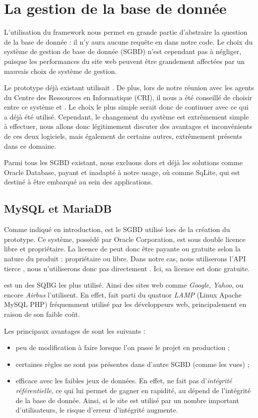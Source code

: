 \section{La gestion de la base de donnée}

L'utilisation du framework \symfony nous permet en grande partie d'abstraire la question de la base de donnée : il n'y aura aucune requête en \sql dans notre code. 
Le choix du système de gestion de base de donnée (SGBD) n'est cependant pas  à négliger, puisque les performances du site web peuvent être grandement affectées par un mauvais choix de système de gestion. 

Le prototype déjà existant utilisait \mysql. 
De plus, lors de notre réunion avec les agents du Centre des Ressources en Informatique (CRI), il nous a été conseillé de choisir entre ce système et \psql. 
Le choix le plus simple serait donc de continuer avec ce qui a déjà été utilisé. 
Cependant, le changement du système est extrêmement simple à effectuer, nous allons donc légitimement  discuter des avantages et inconvénients de ces deux logiciels, mais également de certains autres, extrêmement présents dans ce domaine. 

Parmi tous les SGBD existant, nous excluons dors et déjà les solutions comme Oracle Database, payant et inadapté à notre usage, où comme SqLite, qui est destiné à être embarqué au sein des applications. 
\subsection{MySQL et MariaDB}
 
 Comme indiqué en introduction, \mysql est le SGBD utilisé lors de la création du prototype. Ce système, possédé par Oracle Corporation, est sous double licence libre et propriétaire. La licence de \mysql peut donc être payante ou gratuite selon la nature du produit : propriétaire ou libre. Dans notre cas, nous utiliserons l'API tierce \symfony, nous n'utiliserons donc pas directement \mysql. Ici, sa licence est donc gratuite. 
 
 \mysql est un des SQBG les plus utilisé. Ainsi des sites web comme \textit{Google}, \textit{Yahoo}, ou encore \textit{Airbus}	l'utilisent. En effet, \mysql fait parti du quatuor \textit{LAMP} (Linux Apache MySQL PHP) fréquemment utilisé par les développeurs web, principalement en raison de son faible coût. 
 
 \smallbreak
 
 Les principaux avantages de \mysql sont les suivants : 
 \begin{itemize}
 \item peu de modification à faire lorsque l'on passe le projet en production  ;
 \item certaines règles ne sont pas présentes dans d'autre SGBD (comme les vues) ;
 \item efficace avec les faibles jeux de données. En effet, \mysql ne fait pas d'\textit{intégrité référentielle}, ce qui lui permet de gagner en rapidité, au dépend de l'intégrité de la base de donnée. Ainsi, si le site est utilisé par un nombre important d'utilisateurs, le risque d'erreur d'intégrité augmente. 
 \end{itemize}

